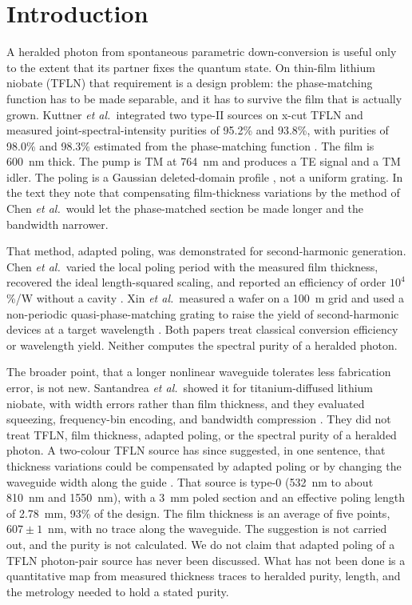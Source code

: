 \documentclass[11pt,a4paper]{article}
\begin{document}
\section{Introduction}
A heralded photon from spontaneous parametric down-conversion is useful only to the extent that its partner fixes the quantum state.
On thin-film lithium niobate (TFLN) that requirement is a design problem: the phase-matching function has to be made separable, and it has to survive the film that is actually grown.
Kuttner \emph{et al.}\ integrated two type-II sources on x-cut TFLN and measured joint-spectral-intensity purities of 95.2\% and 93.8\%, with purities of 98.0\% and 98.3\% estimated from the phase-matching function \cite{Kuttner2026}.
The film is 600~nm thick.
The pump is TM at 764~nm and produces a TE signal and a TM idler.
The poling is a Gaussian deleted-domain profile \cite{Tambasco2016,Kuttner2026}, not a uniform grating.
In the text they note that compensating film-thickness variations by the method of Chen \emph{et al.}\ would let the phase-matched section be made longer and the bandwidth narrower.

That method, adapted poling, was demonstrated for second-harmonic generation.
Chen \emph{et al.}\ varied the local poling period with the measured film thickness, recovered the ideal length-squared scaling, and reported an efficiency of order $10^{4}$\,\%/W without a cavity \cite{Chen2024}.
Xin \emph{et al.}\ measured a wafer on a 100~\textmu m grid and used a non-periodic quasi-phase-matching grating to raise the yield of second-harmonic devices at a target wavelength \cite{Xin2025}.
Both papers treat classical conversion efficiency or wavelength yield.
Neither computes the spectral purity of a heralded photon.

The broader point, that a longer nonlinear waveguide tolerates less fabrication error, is not new.
Santandrea \emph{et al.}\ showed it for titanium-diffused lithium niobate, with width errors rather than film thickness, and they evaluated squeezing, frequency-bin encoding, and bandwidth compression \cite{Santandrea2019}.
They did not treat TFLN, film thickness, adapted poling, or the spectral purity of a heralded photon.
A two-colour TFLN source has since suggested, in one sentence, that thickness variations could be compensated by adapted poling or by changing the waveguide width along the guide \cite{Babel2025,Chen2024,He2024}.
That source is type-0 (532~nm to about 810~nm and 1550~nm), with a 3~mm poled section and an effective poling length of 2.78~mm, 93\% of the design.
The film thickness is an average of five points, $607\pm 1$~nm, with no trace along the waveguide.
The suggestion is not carried out, and the purity is not calculated.
We do not claim that adapted poling of a TFLN photon-pair source has never been discussed.
What has not been done is a quantitative map from measured thickness traces to heralded purity, length, and the metrology needed to hold a stated purity.
\end{document}
